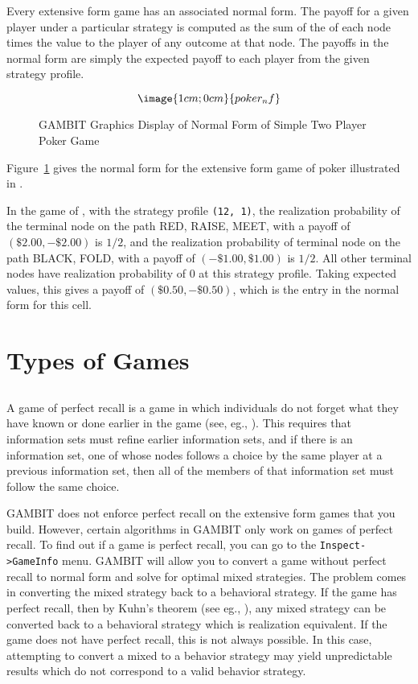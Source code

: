 Every extensive form game has an associated normal form.  The payoff for 
a given player under a particular strategy is computed as the sum of the 
 of each node times the 
value to the player of any outcome at that node.  The payoffs in the normal 
form are simply the expected payoff to each player from the given strategy
 profile.  

\begin{figure}
$$\image{1cm;0cm}{poker_nf}$$
\caption{GAMBIT Graphics Display of Normal Form of
		Simple Two Player Poker Game}\label{fig_samp2}
\end{figure}

Figure~\ref{fig_samp2} gives the normal form for the extensive form game 
of poker illustrated in 
. 

In the game of  , with the 
strategy profile {\tt (12, 1)}, the realization probability of the terminal 
node on the path RED, RAISE, MEET, with a payoff of $(\$2.00, -\$2.00)$ 
is $1/2$, and the realization probability of terminal node on the path 
BLACK, FOLD, with a payoff of  $(-\$1.00, \$1.00)$ is $1/2$.    All other 
terminal nodes have realization probability of $0$ at this strategy profile.  
Taking expected values, this gives a payoff of  
$(\$0.50, -\$0.50)$, which is the entry in the normal form for this cell.  

\section{Types of Games}
\subsection{}\label{perfrecallsec}
A game of perfect recall is a game in which individuals do not forget what
they have known or done earlier in the game (see, eg., \cite{Mye:91}).  
This requires that
information sets must refine earlier information sets, and if there is
an information set, one of whose nodes follows a choice by the same player
at a previous information set, then all of the members of that information
set must follow the same choice.

GAMBIT does not enforce perfect recall on the extensive form games that
you build.  However, certain algorithms in GAMBIT only work on games of 
perfect recall.  
To find out if a game is perfect recall, you can go to the {\tt Inspect->GameInfo} 
menu.  GAMBIT will allow you to convert a game without perfect recall 
to normal form and solve for optimal 
mixed strategies.  The problem comes in converting the mixed strategy back
to a behavioral strategy.  If the game has perfect recall, then by Kuhn's 
theorem (see eg., \cite{vanDamme:1983}), any mixed strategy can be 
converted back to a behavioral strategy which is realization equivalent.   
If the game does not have perfect recall, this is not always possible.  
In this case, attempting to convert a mixed to a behavior strategy 
may yield unpredictable results which do not correspond to a valid 
behavior strategy.   

